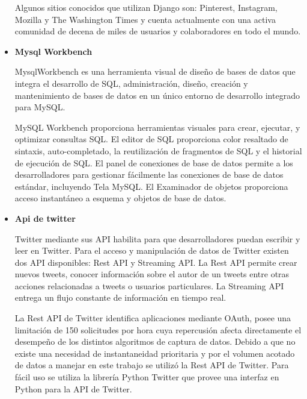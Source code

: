\begin{itemize}
	Algunos sitios conocidos que utilizan Django son: Pinterest, Instagram, Mozilla y The Washington Times y cuenta actualmente con una activa comunidad de decena de miles de usuarios y colaboradores en todo el mundo.
	
	\item \textbf{Mysql Workbench}
	
	MysqlWorkbench \cite{mysqlWorkbenchWeb} es una herramienta visual de diseño de bases de datos que integra el desarrollo de SQL, administración, diseño, creación y mantenimiento de bases de datos en un único entorno de desarrollo integrado para MySQL.
	
	MySQL Workbench proporciona herramientas visuales para crear, ejecutar, y optimizar consultas SQL. El editor de SQL proporciona color resaltado de sintaxis, auto-completado, la reutilización de fragmentos de SQL y el historial de ejecución de SQL. El panel de conexiones de base de datos permite a los desarrolladores para gestionar fácilmente las conexiones de base de datos estándar, incluyendo Tela MySQL. El Examinador de objetos proporciona acceso instantáneo a esquema y objetos de base de datos.
	
	\item \textbf{Api de twitter}
	
	Twitter mediante sus API \cite{twitterWeb} habilita para que desarrolladores puedan escribir y leer en Twitter. Para el acceso y manipulación de datos de Twitter existen dos API disponibles: Rest API y Streaming API. La Rest API permite crear nuevos tweets, conocer información sobre el autor de un tweets entre otras acciones relacionadas a tweets o usuarios particulares. La Streaming API entrega un flujo constante de información en tiempo real.
	
	La Rest API de Twitter identifica aplicaciones mediante OAuth, posee una limitación de 150 solicitudes por hora cuya repercusión afecta directamente el desempeño de los distintos algoritmos de captura de datos. Debido a que no existe una necesidad de instantaneidad prioritaria y por el volumen acotado de datos a manejar en este trabajo se utilizó la Rest API de Twitter. Para fácil uso se utiliza la librería Python Twitter \cite{pythonTwitterCode} \cite{pythonTwitterGithub} que provee una interfaz en Python para la API de Twitter. 
	
	
	\end{itemize}